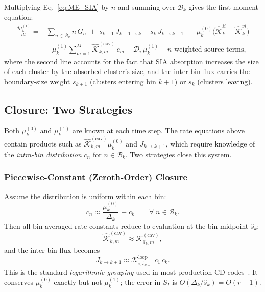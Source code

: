 Multiplying Eq.~\eqref{eq:ME_SIA} by $n$ and summing over
$\mathcal{B}_k$ gives the first-moment equation:
\begin{equation}\label{eq:mu1_eq}
\begin{split}
    \frac{d\mu_k^{(1)}}{dt} = {} &
    \sum_{n \in \mathcal{B}_k} n\,G_n
    \;+\; s_{k+1}\,J_{k-1 \to k} - s_k\,J_{k \to k+1}
    \;+\; \mu_k^{(0)}
         \bigl(\hat{\mathcal{K}}_{k}^{ii} - \hat{\mathcal{K}}_{k}^{vi}\bigr)
    \\[4pt]
    &- \mu_k^{(1)}\sum_{m=1}^{M}
        \hat{\mathcal{K}}_{k,m}^{(\mathrm{cav})}\,\bar{c}_m
    - \mathcal{D}_i\,\mu_k^{(1)}
    + n\text{-weighted source terms},
\end{split}
\end{equation}
where the second line accounts for the fact that SIA absorption
increases the size of each cluster by the absorbed cluster's size,
and the inter-bin flux carries the boundary-size weight $s_{k+1}$
(clusters entering bin $k+1$) or $s_k$ (clusters leaving).

\subsection{Closure: Two Strategies}
\label{sec:closure}

Both $\mu_k^{(0)}$ and $\mu_k^{(1)}$ are known at each time step.
The rate equations above contain products such as
$\hat{\mathcal{K}}_{k,m}^{(\mathrm{cav})} \mu_k^{(0)}$ and
$J_{k\to k+1}$, which require knowledge of the \emph{intra-bin
distribution} $c_n$ for $n \in \mathcal{B}_k$. Two strategies
close this system.

\subsubsection{Piecewise-Constant (Zeroth-Order) Closure}
\label{sec:pc_closure}

Assume the distribution is uniform within each bin:
\begin{equation}\label{eq:pc_ansatz}
    c_n \approx \frac{\mu_k^{(0)}}{\Delta_k}
    \equiv \bar{c}_k
    \qquad \forall\; n \in \mathcal{B}_k.
\end{equation}
Then all bin-averaged rate constants reduce to evaluation at the bin
midpoint $\hat{s}_k$:
\begin{equation}\label{eq:Khat_pc}
    \hat{\mathcal{K}}_{k,m}^{(\mathrm{cav})}
    \approx \mathcal{K}_{\hat{s}_k,m}^{(\mathrm{cav})},
\end{equation}
and the inter-bin flux becomes
\begin{equation}\label{eq:Jkk1_pc}
    J_{k \to k+1}
    \approx \mathcal{K}_{i,\hat{s}_{k+1}}^{\mathrm{loop}}\,
            c_1\,\bar{c}_k.
\end{equation}
This is the standard \emph{logarithmic grouping} used in most
production CD codes~\cite{Golubov2001,Barashev2004}. It conserves
$\mu_k^{(0)}$ exactly but not $\mu_k^{(1)}$; the error in $S_I$ is
$O(\Delta_k/\hat{s}_k) = O(r-1)$.

